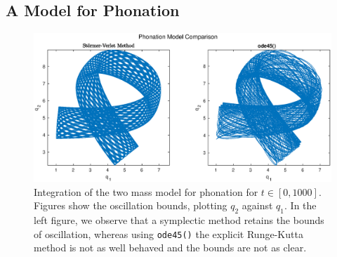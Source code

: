\documentclass{report}
\theoremstyle{exampstyle} \newtheorem{example}[theorem]{Example}
\theoremstyle{exampstyle} \newtheorem{remark}[theorem]{Remark}
\theoremstyle{exampstyle} \newtheorem{definition}[theorem]{Definition}
\theoremstyle{exampstyle} \newtheorem{lemma}[theorem]{Lemma}
\theoremstyle{exampstyle} \newtheorem{proposition}[theorem]{Proposition}
\begin{document}
\subsection{A Model for Phonation}


\begin{figure}
	\centering
	\includegraphics[width = \linewidth]{figures/phonationcomp.eps}
	\caption{
		Integration of the two mass model for phonation for $t \in [0, 1000]$.
		Figures show the oscillation bounds, plotting $q_2$ against $q_1$.
		In the left figure, we observe that a symplectic method retains the bounds of oscillation,
		whereas using \texttt{ode45()} the explicit Runge-Kutta method is not as well behaved and the bounds are not as clear. 
	}
	\label{fig:phon}
\end{figure}
\end{document}
